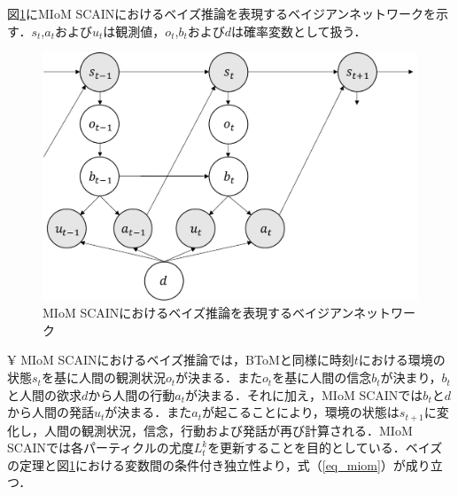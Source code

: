 \par
図\ref{fig:miom}にMIoM SCAINにおけるベイズ推論を表現するベイジアンネットワークを示す．$s_t$,$a_t$および$u_t$は観測値，$o_t$,$b_t$および$d$は確率変数として扱う．
\begin{figure}[htbp]
  \begin{center}
    \includegraphics[scale=0.7]{./miom.pdf}
    \caption{MIoM SCAINにおけるベイズ推論を表現するベイジアンネットワーク}
    \label{fig:miom}
  \end{center}
\end{figure}¥
MIoM SCAINにおけるベイズ推論では，BToMと同様に時刻$t$における環境の状態$s_{t}$を基に人間の観測状況$o_{t}$が決まる．また$o_{t}$を基に人間の信念$b_{t}$が決まり，$b_{t}$と人間の欲求$d$から人間の行動$a_{t}$が決まる．それに加え，MIoM SCAINでは$b_t$と$d$から人間の発話$u_t$が決まる．また$a_{t}$が起こることにより，環境の状態は$s_{t+1}$に変化し，人間の観測状況，信念，行動および発話が再び計算される．MIoM SCAINでは各パーティクルの尤度$L^k_t$を更新することを目的としている．ベイズの定理と図\ref{fig:miom}における変数間の条件付き独立性より，式（\ref{eq_miom}）が成り立つ．
